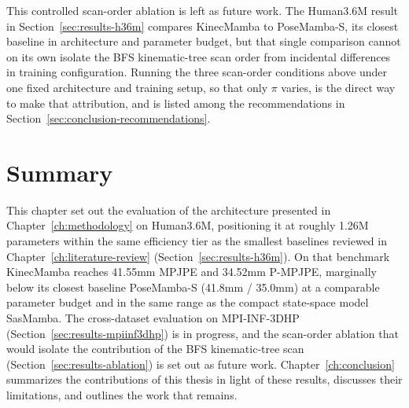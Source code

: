 This controlled scan-order ablation is left as future work. The Human3.6M
result in Section~\ref{sec:results-h36m} compares KinecMamba to PoseMamba-S,
its closest baseline in architecture and parameter budget, but that single
comparison cannot on its own isolate the BFS kinematic-tree scan order from
incidental differences in training configuration. Running the three
scan-order conditions above under one fixed architecture and training setup,
so that only $\pi$ varies, is the direct way to make that attribution, and is
listed among the recommendations in
Section~\ref{sec:conclusion-recommendations}.

\section{Summary}
\label{sec:results-summary}

This chapter set out the evaluation of the architecture presented in
Chapter~\ref{ch:methodology} on Human3.6M, positioning it at roughly
1.26M parameters within the same efficiency tier as the smallest
baselines reviewed in Chapter~\ref{ch:literature-review}
(Section~\ref{sec:results-h36m}). On that benchmark KinecMamba reaches
41.55mm MPJPE and 34.52mm P-MPJPE, marginally below its closest baseline
PoseMamba-S (41.8mm / 35.0mm) at a comparable parameter budget and in the
same range as the compact state-space model SasMamba. The cross-dataset
evaluation on MPI-INF-3DHP (Section~\ref{sec:results-mpiinf3dhp}) is in
progress, and the scan-order ablation that would isolate the contribution of
the BFS kinematic-tree scan (Section~\ref{sec:results-ablation}) is set out as
future work.
Chapter~\ref{ch:conclusion} summarizes the contributions of this thesis in
light of these results, discusses their limitations, and outlines the work
that remains.

\FloatBarrier

